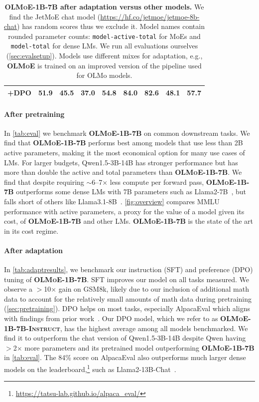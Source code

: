 \documentclass{article}
\newcommand{\model}{\textbf{\textsc{OLMoE}}}
\newcommand{\modelsmall}{\textbf{\textsc{OLMoE-1B-7B}}}
\newcommand{\modelsmalldpo}{\textbf{\textsc{OLMoE-1B-7B-Instruct}}}
\begin{document}
\begin{table}[htbp]
{\begin{tabular}{l|ccccccc|c}
\rowcolor{lightOlmoeYellow}
\textbf{+DPO} & 51.9 & 45.5 & 37.0 & 54.8 & \textbf{84.0} & 82.6 & \textbf{48.1} & \textbf{57.7} \\
\bottomrule
\end{tabular}
}
\vspace{.5em}
\caption{\textbf{\modelsmall{} after adaptation versus other models.} We find the JetMoE chat model (\url{https://hf.co/jetmoe/jetmoe-8b-chat}) has random scores thus we exclude it. Model names contain rounded parameter counts: \texttt{model-active-total} for MoEs and \texttt{model-total} for dense LMs. We run all evaluations ourselves (\autoref{sec:evalsetup}). Models use different mixes for adaptation, e.g., \model{} is trained on an improved version of the pipeline used for OLMo models.}
\label{tab:adaptresults}
\end{table}

\paragraph{After pretraining} In \autoref{tab:eval} we benchmark \modelsmall{} on common downstream tasks. We find that \modelsmall{} performs best among models that use less than 2B active parameters, making it the most economical option for many use cases of LMs. For larger budgets, Qwen1.5-3B-14B has stronger performance but has more than double the active and total parameters than \modelsmall{}. We find that despite requiring $\sim$6--7$\times$ less compute per forward pass, \modelsmall{} outperforms some dense LMs with 7B parameters such as Llama2-7B~\citep{touvron2023llama2openfoundation}, but falls short of others like Llama3.1-8B~\citep{dubey2024llama3herdmodels}. \autoref{fig:overview} compares MMLU performance with active parameters, a proxy for the value of a model given its cost, of \modelsmall{} and other LMs. \modelsmall{} is the state of the art in its cost regime.

\paragraph{After adaptation} In \autoref{tab:adaptresults}, we benchmark our instruction (SFT) and preference (DPO) tuning of \modelsmall{}. SFT improves our model on all tasks measured. We observe a $>$10$\times$ gain on GSM8k, likely due to our inclusion of additional math data to account for the relatively small amounts of math data during pretraining (\autoref{sec:pretraining}). DPO helps on most tasks, especially AlpacaEval which aligns with findings from prior work~\citep{wang2023far,ivison2023camels,muennighoff2024generativerepresentationalinstructiontuning}. Our DPO model, which we refer to as \modelsmalldpo{}, has the highest average among all models benchmarked. We find it to outperform the chat version of Qwen1.5-3B-14B despite Qwen having $>$2$\times$ more parameters and its pretrained model outperforming \modelsmall{} in \autoref{tab:eval}. The 84\% score on AlpacaEval also outperforms much larger dense models on the leaderboard,\footnote{\url{https://tatsu-lab.github.io/alpaca_eval/}} such as Llama2-13B-Chat~\citep{touvron2023llama2openfoundation}.
\end{document}
